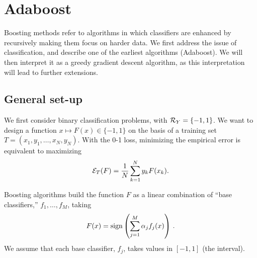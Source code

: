 \section{Adaboost}

Boosting methods refer to algorithms in which classifiers are enhanced by
recursively making them focus on harder data. We first address the issue
of classification, and describe one of the earliest  algorithms (Adaboost). We will then
interpret it as a greedy gradient descent algorithm, as this interpretation will lead to further extensions. 

\subsection{General set-up}
We first consider binary classification problems, with ${\mathcal R}_Y=\{-1,1\}$. We want to design a function $x \mapsto F(x) \in \{-1, 1\}$ on the
basis of a training set $T = (x_1, y_1, \ldots, x_N, y_N)$. With the 0-1
loss, minimizing the  empirical error is equivalent to maximizing
$$
{\mathcal E}_T(F) = \frac{1}{N} \sum_{k=1}^N y_k F(x_k).
$$

Boosting algorithms build the function $F$ as a linear combination of
``base classifiers,'' $f_1, \ldots, f_M$, taking
$$
F(x) = \text{sign}\left(\sum_{j=1}^M \alpha_j f_j(x)\right)\,.
$$
We assume that each base classifier, $f_j$, takes values in $[-1, 1]$ (the interval). 
\medskip

